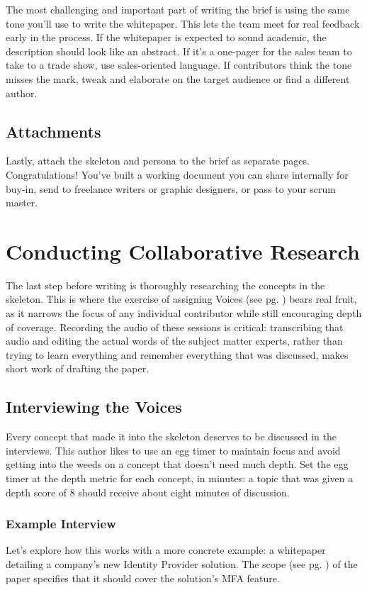 \documentclass[letterpaper]{article}
\begin{document}
The most challenging and important part of writing the brief is using the same tone you'll use to write the whitepaper. This lets the team meet for real feedback early in the process. If the whitepaper is expected to sound academic, the description should look like an abstract. If it's a one-pager for the sales team to take to a trade show, use sales-oriented language. If contributors think the tone misses the mark, tweak and elaborate on the target audience or find a different author.

\subsection{Attachments}
Lastly, attach the skeleton and persona to the brief as separate pages. Congratulations! You've built a working document you can share internally for buy-in, send to freelance writers or graphic designers, or pass to your scrum master.

\section{Conducting Collaborative Research}
The last step before writing is thoroughly researching the concepts in the skeleton. This is where the exercise of assigning Voices (see pg. \pageref{topic:voices}) bears real fruit, as it narrows the focus of any individual contributor while still encouraging depth of coverage. Recording the audio of these sessions is critical: transcribing that audio and editing the actual words of the subject matter experts, rather than trying to learn everything and remember everything that was discussed, makes short work of drafting the paper.

\subsection{Interviewing the Voices}

Every concept that made it into the skeleton deserves to be discussed in the interviews. This author likes to use an egg timer to maintain focus and avoid getting into the weeds on a concept that doesn't need much depth. Set the egg timer at the depth metric for each concept, in minutes: a topic that was given a depth score of 8 should receive about eight minutes of discussion.

\subsubsection{Example Interview}
Let's explore how this works with a more concrete example: a whitepaper detailing a company's new Identity Provider solution. The scope (see pg. \pageref{topic:scope}) of the paper specifies that it should cover the solution's MFA feature.
\end{document}
